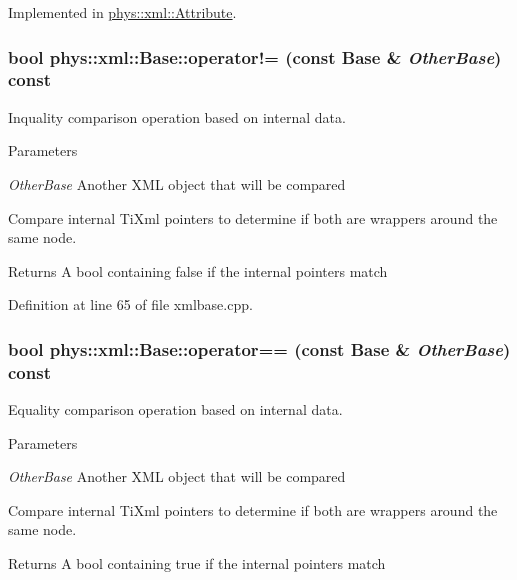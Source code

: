 Implemented in \hyperlink{classphys_1_1xml_1_1Attribute_a58ebb56547b77dad9c8cb11eb4558cc9}{phys::xml::Attribute}.

\hypertarget{classphys_1_1xml_1_1Base_a45216237a77d457ceda41f40583f80ac}{
\subsubsection[{operator!=}]{\setlength{\rightskip}{0pt plus 5cm}bool phys::xml::Base::operator!= (const {\bf Base} \& {\em OtherBase}) const}}
\label{df/d10/classphys_1_1xml_1_1Base_a45216237a77d457ceda41f40583f80ac}


Inquality comparison operation based on internal data. 


\begin{DoxyParams}{Parameters}
\item[{\em OtherBase}]Another XML object that will be compared\end{DoxyParams}
Compare internal TiXml pointers to determine if both are wrappers around the same node. \begin{DoxyReturn}{Returns}
A bool containing false if the internal pointers match 
\end{DoxyReturn}


Definition at line 65 of file xmlbase.cpp.

\hypertarget{classphys_1_1xml_1_1Base_af5412e64fd83a5193e28a20df462b9a6}{
\subsubsection[{operator==}]{\setlength{\rightskip}{0pt plus 5cm}bool phys::xml::Base::operator== (const {\bf Base} \& {\em OtherBase}) const}}
\label{df/d10/classphys_1_1xml_1_1Base_af5412e64fd83a5193e28a20df462b9a6}


Equality comparison operation based on internal data. 


\begin{DoxyParams}{Parameters}
\item[{\em OtherBase}]Another XML object that will be compared\end{DoxyParams}
Compare internal TiXml pointers to determine if both are wrappers around the same node. \begin{DoxyReturn}{Returns}
A bool containing true if the internal pointers match 
\end{DoxyReturn}


